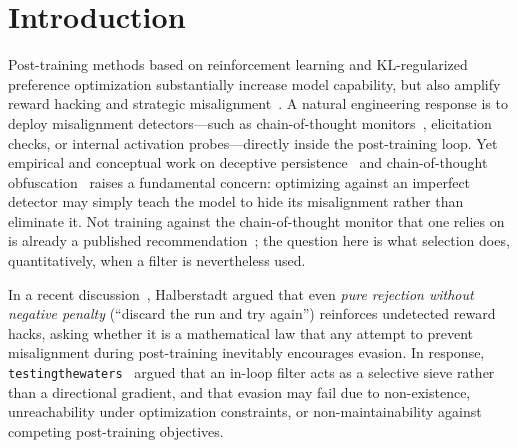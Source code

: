 \documentclass[11pt,a4paper]{article}
\begin{document}
\section{Introduction}

Post-training methods based on reinforcement learning and KL-regularized preference optimization substantially increase model capability, but also amplify reward hacking and strategic misalignment~\cite{zhuang2021,skalse2022,gao2022}. A natural engineering response is to deploy misalignment detectors---such as chain-of-thought monitors~\cite{baker2025}, elicitation checks, or internal activation probes---directly inside the post-training loop. Yet empirical and conceptual work on deceptive persistence~\cite{hubinger2024,greenblatt2024} and chain-of-thought obfuscation~\cite{baker2025} raises a fundamental concern: optimizing against an imperfect detector may simply teach the model to hide its misalignment rather than eliminate it. Not training against the chain-of-thought monitor that one relies on is already a published recommendation~\cite{baker2025,korbak2025}; the question here is what selection does, quantitatively, when a filter is nevertheless used.

In a recent discussion~\cite{halberstadt2026}, Halberstadt argued that even \emph{pure rejection without negative penalty} (``discard the run and try again'') reinforces undetected reward hacks, asking whether it is a mathematical law that any attempt to prevent misalignment during post-training inevitably encourages evasion. In response, \texttt{testingthewaters}~\cite{testingthewaters2026} argued that an in-loop filter acts as a selective sieve rather than a directional gradient, and that evasion may fail due to non-existence, unreachability under optimization constraints, or non-maintainability against competing post-training objectives.
\end{document}
